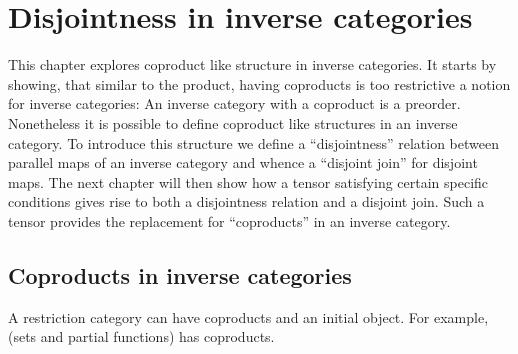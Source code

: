 \chapter{Disjointness in inverse categories} %
\label{cha:disjointness_in_inverse_categories}

This chapter explores coproduct like structure in inverse categories. It starts by showing,
that similar to the product, having coproducts is too restrictive a notion for inverse categories: An
inverse category with a coproduct is a preorder.
Nonetheless it is possible to define coproduct like structures in an inverse category. To introduce
this structure we define a ``disjointness'' relation between parallel maps of an inverse category
and whence a ``disjoint join'' for disjoint maps. The  next chapter will then show how a
tensor satisfying certain specific conditions gives rise to both a disjointness relation and a
disjoint join. Such a tensor provides the replacement for ``coproducts'' in an inverse category.



\section{Coproducts in inverse categories} %
\label{sec:coproducts_in_inverse_categories}

A restriction category can have coproducts and an initial object. For example, \Par (sets and
partial functions) has coproducts.

